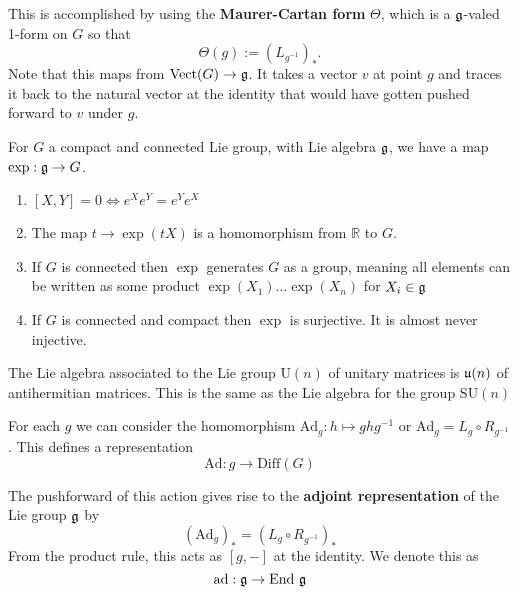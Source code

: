 		This is accomplished by using the \textbf{Maurer-Cartan form} $\Theta$, which is a $\frak g$-valed 1-form on $G$ so that 
		\begin{equation}
			\Theta(g) := (L_{g^{-1}})_*.
		\end{equation}
		Note that this maps from $\mathrm{Vect}(G) \rightarrow \frak g$. It takes a vector $v$ at point $g$ and traces it back to the natural vector at the identity that would have gotten pushed forward to $v$ under $g$.
		
		\begin{prop}
			For $G$ a compact and connected Lie group, with Lie algebra $\frak g$, we have a map $\exp : \frak g \rightarrow G$.
			\begin{enumerate}
				\item $[X,Y] = 0 \Leftrightarrow e^X e^Y = e^Y e^X$
				\item The map $t \rightarrow \exp(t X)$ is a homomorphism from $\mathbb R$ to $G$.
				\item If $G$ is connected then $\exp$ generates $G$ as a group, meaning all elements can be written as some product $\exp(X_1) \dots \exp(X_n)$ for $X_i \in \frak g$
				\item If $G$ is connected and compact then $\exp$ is surjective. It is almost never injective.
			\end{enumerate}
		\end{prop}
		
		\begin{eg}
			The Lie algebra associated to the Lie group $\mathrm U(n)$ of unitary matrices is $\frak u(n)$ of antihermitian matrices. This is the same as the Lie algebra for the group $\mathrm{SU}(n)$
		\end{eg}
		
		\begin{defn}
			For each $g$ we can consider the homomorphism $\mathrm{Ad}_g: h \mapsto g h g^{-1}$ or $\mathrm{Ad}_g = L_g \circ R_{g^{-1}}$. This defines a representation
			\[
				\mathrm{Ad}: g \rightarrow \mathrm{Diff}(G)
			\]
		\end{defn}
		
		\begin{defn}
			The pushforward of this action gives rise to the \textbf{adjoint representation} of the Lie group $\frak g$ by
			\[
				(\mathrm{Ad}_g)_* = (L_g \circ R_{g^{-1}})_* 
			\]
			From the product rule, this acts as $[g, -]$ at the identity. We denote this as
			\[
				\mathrm{ad}: \frak g \rightarrow \mathrm{End}~ \frak g
			\]
		\end{defn}
		
